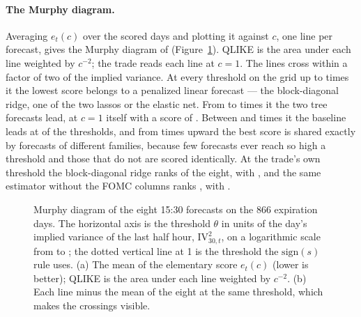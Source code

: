\paragraph{The Murphy diagram.} Averaging $e_t(c)$ over the scored days and
plotting it against $c$, one line per forecast, gives the Murphy diagram of
\citet{Ehm2016} (Figure~\ref{fig:close_option_murphy}). QLIKE is the area
under each line weighted by $c^{-2}$; the trade reads each line at $c = 1$.
The lines cross within a factor of two of the implied variance. At every
threshold on the grid up to \murLinUpper{} times it the lowest score belongs
to a penalized linear forecast --- the block-diagonal ridge, one of the two
lassos or the elastic net. From \murTreeLower{} to \murTreeUpper{} times it
the two tree forecasts lead, \murBestSlice{} at $c = 1$ itself with a score
of \murBestSliceScore{}. Between \murBaseLower{} and \murBaseUpper{} times it
the baseline leads at \murBaseLeadN{} of the \murBaseRegionN{} thresholds, and
from \murTieLower{} times upward the best score is shared exactly by
forecasts of different families, because few forecasts ever reach so high a
threshold and those that do not are scored identically. At the trade's own
threshold the block-diagonal ridge ranks \murRidgeRank{} of the eight, with
\murRidgeSliceScore{}, and the same estimator without the FOMC columns ranks
\murRidgeNoFomcRank{}, with \murRidgeNoFomcScore{}.

\begin{figure}[H]
\centering
{}
\caption{Murphy diagram of the eight 15:30 forecasts on the 866 expiration
days. The horizontal axis is the threshold $\theta$ in units of the day's
implied variance of the last half hour, $\mathrm{IV}^2_{30,t}$, on a
logarithmic scale from \murGridMin{} to \murGridMax{}; the dotted vertical
line at 1 is the threshold the $\mathrm{sign}(s)$ rule uses. (a) The mean of
the elementary score $e_t(c)$ (lower is better); QLIKE is the area under each
line weighted by $c^{-2}$. (b) Each line minus the mean of the eight at the
same threshold, which makes the crossings visible.}
\label{fig:close_option_murphy}
\end{figure}

